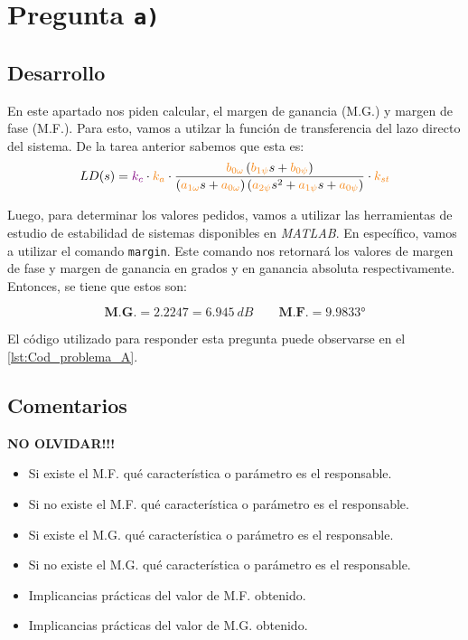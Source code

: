 \section{Pregunta \texttt{a)}}\label{pregunta-a}

\subsection{Desarrollo}

En este apartado nos piden calcular, el margen de ganancia (M.G.) y margen de fase
(M.F.). Para esto, vamos a utilzar la función de transferencia del lazo directo del
sistema. De la tarea anterior \cite{tarea-2-sdc} sabemos que esta es:
\begin{equation}
  LD(s) = \mora{k_c} \cdot \nara{k_a} \cdot \frac{\nara{b_{0\omega}} \left(\nara{b_{1\psi}}s + \nara{b_{0\psi}}\right)}
  {\left(\nara{a_{1\omega}}s + \nara{a_{0\omega}}\right)\left(\nara{a_{2\psi}}s^2 + \nara{a_{1\psi}}s + \nara{a_{0\psi}}\right)} \cdot \nara{k_{st}}
\end{equation}

Luego, para determinar los valores pedidos, vamos a utilizar las herramientas
de estudio de estabilidad de sistemas disponibles en \textit{MATLAB}. En
específico, vamos a utilizar el comando \texttt{margin}. Este comando nos
retornará los valores de margen de fase y margen de ganancia en grados y en
ganancia absoluta respectivamente. Entonces, se tiene que estos son:

\begin{equation}
  \boxed{\textbf{M.G.} = 2.2247 = 6.945\ \unit{dB}} \qquad \boxed{\textbf{M.F.} = \ang{9.9833}}
\end{equation}

El código utilizado para responder esta pregunta puede observarse en el
\autoref{lst:Cod_problema_A}.

\subsection{Comentarios}
\textbf{NO OLVIDAR!!!}

\begin{itemize}
  \item Si existe el M.F. qué característica o parámetro es el responsable.
  \item Si no existe el M.F. qué característica o parámetro es el responsable.
  \item Si existe el M.G. qué característica o parámetro es el responsable.
  \item Si no existe el M.G. qué característica o parámetro es el responsable.
  \item Implicancias prácticas del valor de M.F. obtenido.
  \item Implicancias prácticas del valor de M.G. obtenido.
\end{itemize}




